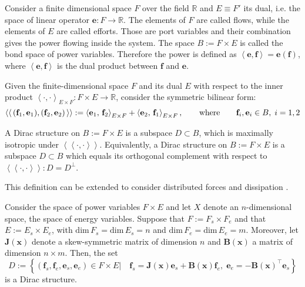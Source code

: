 Consider a  finite dimensional space ${F}$ over the field $\mathbb{R}$ and ${E} \equiv {F}'$ its dual, i.e. the space of linear operator $\mathbf{e} : {F} \rightarrow \mathbb{R}$. The elements of $\mathit{F}$ are called flows, while the elements of ${E}$ are called efforts. Those are port variables and their combination gives the power flowing inside the system. The space ${B} := {F} \times {E}$ is called the bond space of power variables. Therefore the power is defined as  $\left\langle \mathbf{e}, \mathbf{f} \right\rangle = \bm{e}(\mathbf{f})$, where $\left\langle \mathbf{e} , \mathbf{f} \right\rangle$ is the dual product between $\mathbf{f}$ and $\mathbf{e}$.
\begin{definition}
	Given the finite-dimensional space ${F}$ and its dual ${E}$ with respect to the inner product $\left\langle \cdot , \cdot \right\rangle_{E \times F} : {F} \times {E} \rightarrow \mathbb{R}$, consider the symmetric bilinear form:
	\begin{equation}
	\bilprod{(\mathbf{f}_1, \mathbf{e}_1)}{(\mathbf{f}_2, \mathbf{e}_2)} := \inner[E \times F]{\mathbf{e}_1}{\mathbf{f}_2} +  \inner[E \times F]{\mathbf{e}_2}{\mathbf{f}_1}, \where \mathbf{f}_i, \mathbf{e}_i \in {B}, \; i = 1, 2
	\end{equation}
	
	A Dirac structure on ${B} := {F} \times {E}$ is a subspace ${D} \subset {B}$, which is maximally isotropic under $\left\langle \left\langle \cdot, \cdot \right\rangle \right\rangle$.	Equivalently, a Dirac structure on ${B} := {F} \times {E}$ is a subspace ${D} \subset {B}$ 	which equals its orthogonal complement with respect to $\left\langle \left\langle \cdot, \cdot \right\rangle \right\rangle: {D} ={D}^\perp$.
\end{definition}
This definition can be extended to consider distributed forces and dissipation \cite{villegas2007}.
\begin{proposition}
	\label{prop:Dirac}
	Consider the space of power variables ${F} \times {E}$ and let ${X}$ denote an $n$-dimensional space, the space of energy variables. Suppose that ${F} := {F}_s \times {F}_e $ and that ${E} := {E}_s  \times {E}_e $, with $\text{dim} \, {F}_s = \text{dim} \, {E}_s = n$ and $\text{dim} \, {F}_e = \text{dim} \, {E}_e = m$. Moreover, let $\mathbf{J}(\mathbf{x})$ denote
	a skew-symmetric matrix of dimension $n$ and $\mathbf{B}(\mathbf{x})$ a matrix of dimension $n \times m$. Then, the set
	\begin{equation}
	{D} := \left\{ (\mathbf{f}_s, \mathbf{f}_e , \mathbf{e}_s ,\mathbf{e}_e ) \in {F} \times {E} \vert \quad \mathbf{f}_s = \mathbf{J}(\mathbf{x}) \mathbf{e}_s + \mathbf{B}(\mathbf{x}) \mathbf{f}_e, \; \mathbf{e}_e = -\mathbf{B}(\mathbf{x})^\top \mathbf{e}_s \right\}
	\end{equation}
	is a Dirac structure.
\end{proposition}

